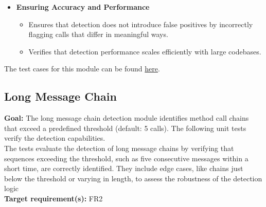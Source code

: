 \documentclass[12pt, titlepage]{article}
\begin{document}
\begin{itemize}
    \item \textbf{Ensuring Accuracy and Performance}
    \begin{itemize}
        \item Ensures that detection does not introduce false positives by incorrectly flagging calls that differ in meaningful ways.
        \item Verifies that detection performance scales efficiently with large codebases.
    \end{itemize}
\end{itemize}

\noindent The test cases for this module can be found \href{https://github.com/ssm-lab/capstone--source-code-optimizer/blob/new-poc/tests/analyzers/test_detect_repeated_calls.py}{here}.

\subsection{Long Message Chain}

\textbf{Goal:} The long message chain detection module identifies method call chains that exceed a predefined threshold (default: 5 calls). The following unit tests verify the detection capabilities. \\

\noindent The tests evaluate the detection of long message chains by verifying that sequences exceeding the threshold, such as five consecutive messages within a short time, are correctly identified. They include edge cases, like chains just below the threshold or varying in length, to assess the robustness of the detection logic\\

\noindent\textbf{Target requirement(s):} FR2 ~\cite{SRS} \\
\end{document}
